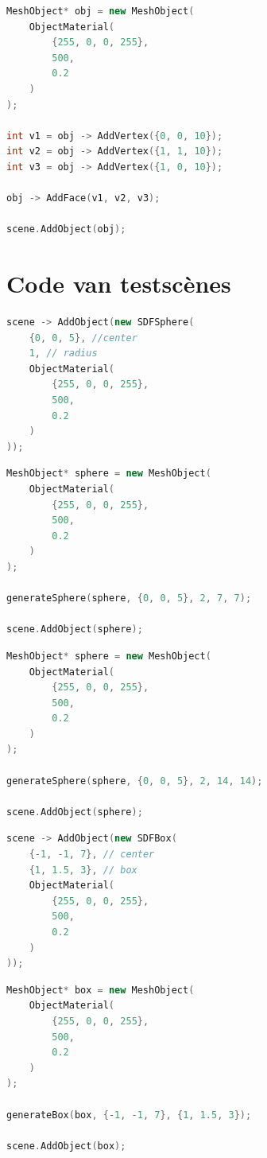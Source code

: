 \documentclass[12pt, a4paper]{article}
\begin{document}
\begin{lstlisting}[language=C++,caption={Driehoek}]
MeshObject* obj = new MeshObject(
	ObjectMaterial(
		{255, 0, 0, 255},
		500,
		0.2
	)
);

int v1 = obj -> AddVertex({0, 0, 10});
int v2 = obj -> AddVertex({1, 1, 10});
int v3 = obj -> AddVertex({1, 0, 10});

obj -> AddFace(v1, v2, v3);

scene.AddObject(obj);
\end{lstlisting}

\clearpage

\section{Code van testscènes} \label{test_code}

\begin{lstlisting}[language=C++,caption={Test \#1 SDF}]
scene -> AddObject(new SDFSphere(
	{0, 0, 5}, //center
	1, // radius
	ObjectMaterial(
		{255, 0, 0, 255},
		500,
		0.2
	)
));

\end{lstlisting}

\begin{lstlisting}[language=C++,caption={Test \#1 Lowres Mesh}]
MeshObject* sphere = new MeshObject(
	ObjectMaterial(
		{255, 0, 0, 255},
		500,
		0.2
	)
);

generateSphere(sphere, {0, 0, 5}, 2, 7, 7);

scene.AddObject(sphere);

\end{lstlisting}

\begin{lstlisting}[language=C++,caption={Test \#1 Highres Mesh}]
MeshObject* sphere = new MeshObject(
	ObjectMaterial(
		{255, 0, 0, 255},
		500,
		0.2
	)
);

generateSphere(sphere, {0, 0, 5}, 2, 14, 14);

scene.AddObject(sphere);

\end{lstlisting}

\begin{lstlisting}[language=C++,caption={Test \#2 SDF}]
scene -> AddObject(new SDFBox(
	{-1, -1, 7}, // center
	{1, 1.5, 3}, // box
	ObjectMaterial(
		{255, 0, 0, 255},
		500,
		0.2
	)
));

\end{lstlisting}

\begin{lstlisting}[language=C++,caption={Test \#2 Mesh}]
MeshObject* box = new MeshObject(
	ObjectMaterial(
		{255, 0, 0, 255},
		500,
		0.2
	)
);

generateBox(box, {-1, -1, 7}, {1, 1.5, 3});

scene.AddObject(box);

\end{lstlisting}
\end{document}
